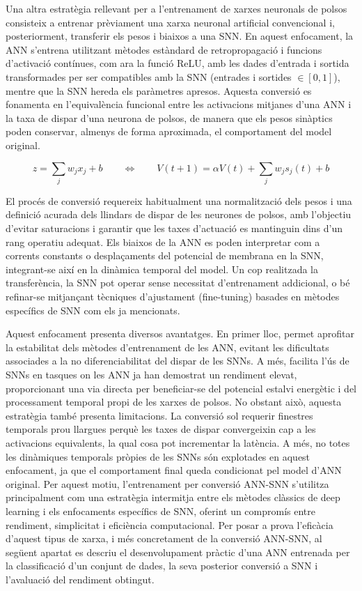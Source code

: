\documentclass[a4paper,11pt, titlepage, twoside]{article}
\begin{document}
Una altra estratègia rellevant per a l'entrenament de xarxes neuronals de polsos consisteix a entrenar prèviament una xarxa neuronal artificial convencional i, posteriorment, transferir els pesos i biaixos a una SNN. En aquest enfocament, la ANN s'entrena utilitzant mètodes estàndard de retropropagació i funcions d'activació contínues, com ara la funció ReLU, amb les dades d'entrada i sortida transformades per ser compatibles amb la SNN (entrades i sortides $\in {[0,1]}$), mentre que la SNN hereda els paràmetres apresos. Aquesta conversió es fonamenta en l'equivalència funcional entre les activacions mitjanes d'una ANN i la taxa de dispar d'una neurona de polsos, de manera que els pesos sinàptics poden conservar, almenys de forma aproximada, el comportament del model original.

\begin {equation}
z = \sum_{j} w_j x_j + b
\qquad \Longleftrightarrow \qquad
V(t+1) = \alpha V(t) + \sum_{j} w_j s_j(t) + b
\end{equation}


El procés de conversió requereix habitualment una normalització dels pesos i una definició acurada dels llindars de dispar de les neurones de polsos, amb l'objectiu d'evitar saturacions i garantir que les taxes d'actuació es mantinguin dins d'un rang operatiu adequat. Els biaixos de la ANN es poden interpretar com a corrents constants o desplaçaments del potencial de membrana en la SNN, integrant-se així en la dinàmica temporal del model. Un cop realitzada la transferència, la SNN pot operar sense necessitat d'entrenament addicional, o bé refinar-se mitjançant tècniques d'ajustament (fine-tuning) basades en mètodes específics de SNN com els ja mencionats.

Aquest enfocament presenta diversos avantatges. En primer lloc, permet aprofitar la estabilitat dels mètodes d'entrenament de les ANN, evitant les dificultats associades a la no diferenciabilitat del dispar de les SNNs. A més, facilita l'ús de SNNs en tasques on les ANN ja han demostrat un rendiment elevat, proporcionant una via directa per beneficiar-se del potencial estalvi energètic i del processament temporal propi de les xarxes de polsos. No obstant això, aquesta estratègia també presenta limitacions. La conversió sol requerir finestres temporals prou llargues perquè les taxes de dispar convergeixin cap a les activacions equivalents, la qual cosa pot incrementar la latència. A més, no totes les dinàmiques temporals pròpies de les SNNs són explotades en aquest enfocament, ja que el comportament final queda condicionat pel model d'ANN original. Per aquest motiu, l'entrenament per conversió ANN-SNN s'utilitza principalment com una estratègia intermitja entre els mètodes clàssics de deep learning i els enfocaments específics de SNN, oferint un compromís entre rendiment, simplicitat i eficiència computacional.
Per posar a prova l'eficàcia d'aquest tipus de xarxa, i més concretament de la conversió ANN-SNN, al següent apartat es descriu el desenvolupament pràctic d'una ANN entrenada per la classificació d'un conjunt de dades, la seva posterior conversió a SNN i l'avaluació del rendiment obtingut.
\end{document}
